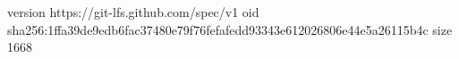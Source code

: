 version https://git-lfs.github.com/spec/v1
oid sha256:1ffa39de9edb6fac37480e79f76fefafedd93343e612026806e44e5a26115b4c
size 1668
